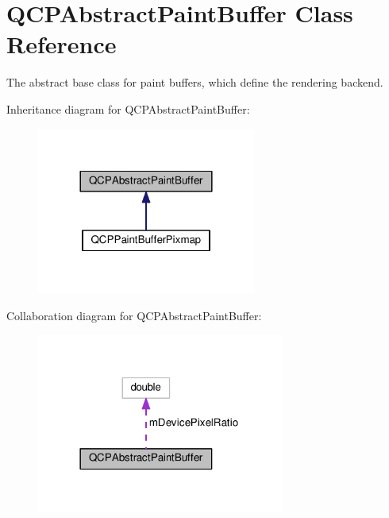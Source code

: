 \hypertarget{classQCPAbstractPaintBuffer}{}\section{Q\+C\+P\+Abstract\+Paint\+Buffer Class Reference}
\label{classQCPAbstractPaintBuffer}


The abstract base class for paint buffers, which define the rendering backend.  




Inheritance diagram for Q\+C\+P\+Abstract\+Paint\+Buffer\+:
\nopagebreak
\begin{figure}[H]
\begin{center}
\leavevmode
\includegraphics[width=204pt]{classQCPAbstractPaintBuffer__inherit__graph}
\end{center}
\end{figure}


Collaboration diagram for Q\+C\+P\+Abstract\+Paint\+Buffer\+:
\nopagebreak
\begin{figure}[H]
\begin{center}
\leavevmode
\includegraphics[width=230pt]{classQCPAbstractPaintBuffer__coll__graph}
\end{center}
\end{figure}
